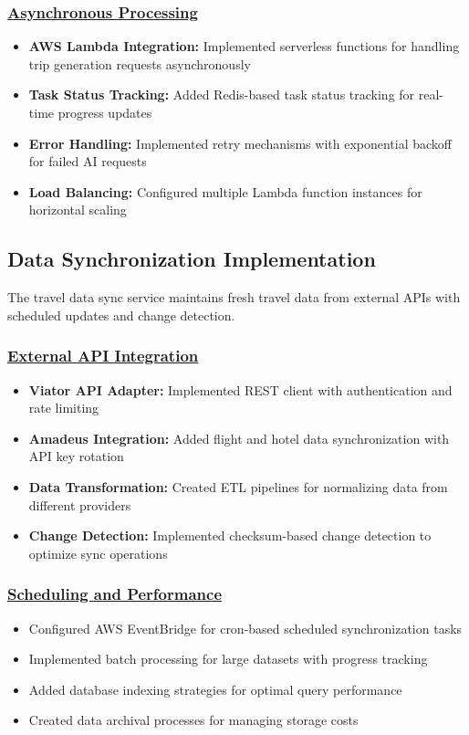 \subsubsection*{\underline{Asynchronous Processing}}
\begin{itemize}
    \item \textbf{AWS Lambda Integration:} Implemented serverless functions for handling trip generation requests asynchronously
    \item \textbf{Task Status Tracking:} Added Redis-based task status tracking for real-time progress updates
    \item \textbf{Error Handling:} Implemented retry mechanisms with exponential backoff for failed AI requests
    \item \textbf{Load Balancing:} Configured multiple Lambda function instances for horizontal scaling
\end{itemize}

\subsection{Data Synchronization Implementation}
The travel data sync service maintains fresh travel data from external APIs with scheduled updates and change detection.

\subsubsection*{\underline{External API Integration}}
\begin{itemize}
    \item \textbf{Viator API Adapter:} Implemented REST client with authentication and rate limiting
    \item \textbf{Amadeus Integration:} Added flight and hotel data synchronization with API key rotation
    \item \textbf{Data Transformation:} Created ETL pipelines for normalizing data from different providers
    \item \textbf{Change Detection:} Implemented checksum-based change detection to optimize sync operations
\end{itemize}

\subsubsection*{\underline{Scheduling and Performance}}
\begin{itemize}
    \item Configured AWS EventBridge for cron-based scheduled synchronization tasks
    \item Implemented batch processing for large datasets with progress tracking
    \item Added database indexing strategies for optimal query performance
    \item Created data archival processes for managing storage costs
\end{itemize}

